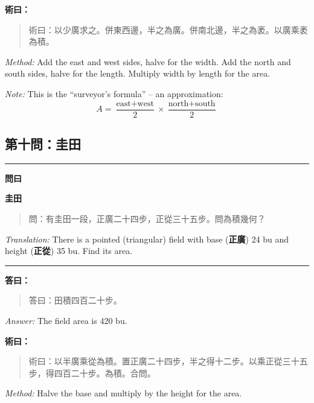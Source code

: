 \documentclass[11pt,a4paper]{article}
\newenvironment{problem}[1][]{%
  \medskip\noindent\rule{\textwidth}{0.4pt}%
  \par\noindent\textbf{\color{sectioncolor}#1}\par\nopagebreak%
  \smallskip%
}{%
  \par\noindent\rule{\textwidth}{0.4pt}\medskip%
}
\newenvironment{answer}{%
  \medskip\noindent{\color{answercolor}\rule{0.5\textwidth}{0.5pt}}%
  \par\color{answercolor}%
}{%
  \par\medskip%
}
\newenvironment{method}{%
  \medskip\noindent{\color{methodcolor}\rule{0.5\textwidth}{0.5pt}}%
  \par\color{methodcolor}%
}{%
  \par\medskip%
}
\begin{document}
\begin{method}
\textbf{術曰：}

\begin{quote}
\textcolor{chinacolor}{%
術曰：以少廣求之。併東西邊，半之為廣。併南北邊，半之為袤。以廣乘袤為積。
}
\end{quote}

\textit{Method:} Add the east and west sides, halve for the width. 
Add the north and south sides, halve for the length. Multiply width by 
length for the area.

\medskip
\textit{Note:} This is the ``surveyor's formula'' -- an approximation:
\[
A = \frac{\text{east}+\text{west}}{2} \times \frac{\text{north}+\text{south}}{2}
\]
\end{method}

\subsection*{第十問：圭田}

\begin{problem}[\textbf{問曰}]
\textbf{\color{sectioncolor}圭田}

\begin{quote}
\textcolor{chinacolor}{%
問：有圭田一段，正廣二十四步，正從三十五步。問為積幾何？
}
\end{quote}

\textit{Translation:} There is a pointed (triangular) field with base 
(\textbf{正廣}) 24 bu and height (\textbf{正從}) 35 bu. Find its area.
\end{problem}

\begin{answer}
\textbf{答曰：}

\begin{quote}
\textcolor{chinacolor}{%
答曰：田積四百二十步。
}
\end{quote}

\textit{Answer:} The field area is 420 bu.
\end{answer}

\begin{method}
\textbf{術曰：}

\begin{quote}
\textcolor{chinacolor}{%
術曰：以半廣乘從為積。置正廣二十四步，半之得十二步。以乘正從三十五步，得四百二十步。為積。合問。
}
\end{quote}

\textit{Method:} Halve the base and multiply by the height for the area.
\end{method}
\end{document}
